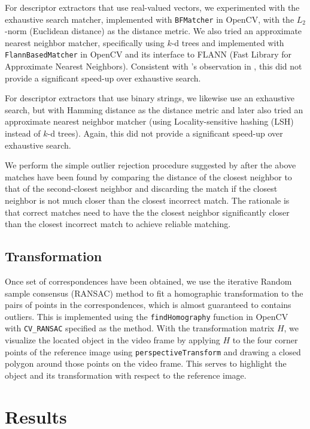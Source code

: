 \documentclass[11pt]{article} %
\theoremstyle{plain}
\theoremstyle{definition}
\theoremstyle{remark}
\numberwithin{equation}{section} %
\numberwithin{figure}{section} %
\numberwithin{table}{section} %
\begin{document}
For descriptor extractors that use real-valued vectors, we experimented with the exhaustive 
search matcher, implemented with \texttt{BFMatcher} in OpenCV, with the $L_2$-norm (Euclidean 
distance) as the distance metric. We also tried an approximate nearest neighbor matcher, 
specifically using $k$-d trees and implemented with \texttt{FlannBasedMatcher} in OpenCV 
and its interface to FLANN (Fast Library for Approximate Nearest Neighbors). Consistent with 
\citeauthor{Lowe2004}'s observation in \citep{Lowe2004}, this did not provide a significant 
speed-up over exhaustive search. 

For descriptor extractors that use binary strings, we likewise use an exhaustive search, but
with Hamming distance as the distance metric and later also tried an approximate nearest neighbor 
matcher (using Locality-sensitive hashing (LSH) instead of $k$-d trees). Again, this did not 
provide a significant speed-up over exhaustive search. 

We perform the simple outlier rejection procedure suggested by \citeauthor{Lowe2004} after 
the above matches have been found by comparing the distance of the closest neighbor 
to that of the second-closest neighbor and discarding the match if the closest neighbor is
not much closer than the closest incorrect match. The rationale is that correct matches need 
to have the the closest neighbor significantly closer than the closest incorrect match to 
achieve reliable matching.

\subsection{Transformation}

Once set of correspondences have been obtained, we use the iterative Random sample consensus 
(RANSAC) method to fit a homographic transformation to the pairs of points in the correspondences,
which is almost guaranteed to contains outliers. This is implemented using the \texttt{findHomography} 
function in OpenCV with \texttt{CV\_RANSAC} specified as the method. With the transformation 
matrix $H$, we visualize the located object in the video frame by applying $H$ to the four corner 
points of the reference image using \texttt{perspectiveTransform} and drawing a closed polygon 
around those points on the video frame. This serves to highlight the object and its transformation 
with respect to the reference image.

\section{Results} \label{sec:results}
\end{document}
